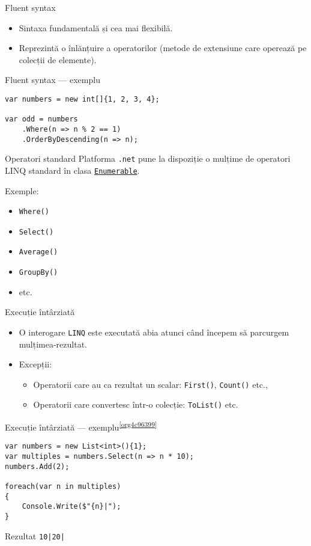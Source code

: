 \documentclass[presentation]{beamer}
\begin{document}
\begin{frame}[label={sec:org04cd5d3}]{Fluent syntax}
\begin{itemize}
\item Sintaxa fundamentală și cea mai flexibilă.
\item Reprezintă o înlănțuire a operatorilor (metode de extensiune care operează pe colecții de elemente).
\end{itemize}
\end{frame}
\begin{frame}[label={sec:org48f301a},fragile]{Fluent syntax --- exemplu}
 \begin{verbatim}
var numbers = new int[]{1, 2, 3, 4};

var odd = numbers
    .Where(n => n % 2 == 1)
    .OrderByDescending(n => n);
\end{verbatim}
\end{frame}
\begin{frame}[label={sec:org6d7b040},fragile]{Operatori standard}
 Platforma \texttt{.net} pune la dispoziție o mulțime de \alert{operatori LINQ standard} în clasa \href{https://docs.microsoft.com/en-us/dotnet/api/system.linq.enumerable?view=netcore-3.1}{\texttt{Enumerable}}.


Exemple:
\begin{itemize}
\item \texttt{Where()}
\item \texttt{Select()}
\item \texttt{Average()}
\item \texttt{GroupBy()}
\item etc.
\end{itemize}
\end{frame}
\begin{frame}[label={sec:orga3856ff},fragile]{Execuție întârziată}
 \begin{itemize}
\item O interogare \texttt{LINQ} este executată abia atunci când începem să parcurgem mulțimea-rezultat.
\item Excepții:
\begin{itemize}
\item Operatorii care au ca rezultat un scalar: \texttt{First()}, \texttt{Count()} etc.,
\item Operatorii care convertesc într-o colecție: \texttt{ToList()} etc.
\end{itemize}
\end{itemize}
\end{frame}
\begin{frame}[label={sec:org366e176},fragile]{Execuție întârziată --- exemplu\textsuperscript{\ref{org4c96399}}}
 \begin{verbatim}
var numbers = new List<int>(){1};
var multiples = numbers.Select(n => n * 10);
numbers.Add(2);

foreach(var n in multiples)
{
    Console.Write($"{n}|");
}
\end{verbatim}
\begin{block}{Rezultat}
\texttt{10|20|}
\end{block}
\end{frame}
\end{document}
